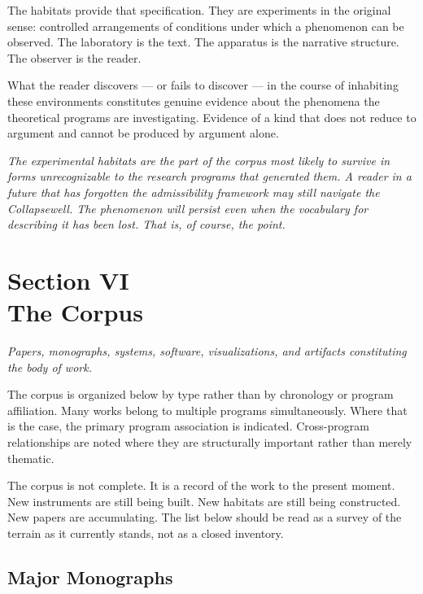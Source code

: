 \documentclass[12pt, openany]{book}
\begin{document}
The habitats provide that specification. They are experiments in the
original sense: controlled arrangements of conditions under which a
phenomenon can be observed. The laboratory is the text. The apparatus
is the narrative structure. The observer is the reader.

What the reader discovers — or fails to discover — in the course of
inhabiting these environments constitutes genuine evidence about the
phenomena the theoretical programs are investigating. Evidence of a
kind that does not reduce to argument and cannot be produced by
argument alone.

\bigskip\bigskip

\noindent\textit{The experimental habitats are the part of the corpus
most likely to survive in forms unrecognizable to the research programs
that generated them. A reader in a future that has forgotten the
admissibility framework may still navigate the Collapsewell. The
phenomenon will persist even when the vocabulary for describing it
has been lost. That is, of course, the point.}

\cleardoublepage

\chapter[The Corpus]{Section VI \\ The Corpus}

\noindent\textit{Papers, monographs, systems, software, visualizations,
and artifacts constituting the body of work.}

\bigskip

\noindent The corpus is organized below by type rather than by chronology
or program affiliation. Many works belong to multiple programs
simultaneously. Where that is the case, the primary program association
is indicated. Cross-program relationships are noted where they are
structurally important rather than merely thematic.

The corpus is not complete. It is a record of the work to the present
moment. New instruments are still being built. New habitats are still
being constructed. New papers are accumulating. The list below should be
read as a survey of the terrain as it currently stands, not as a
closed inventory.

\section{Major Monographs}
\end{document}
